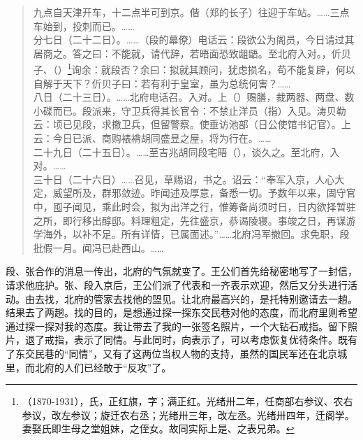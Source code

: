 \begin{quote}
	九点自天津开车，十二点半可到京。偕（郑的长子）往迎于车站。……三点车始到，投刺而已。……\\

分七日（二十二日）。……（段的幕僚）电话云：段欲公为阁员，今日请过其居商之。答之曰：不能就，请代辞，若晤面恐致龃龉。至北府入对。，伒贝子、（）\footnote{（1870-1931），氏，正红旗，字；满正红。光绪卅二年，任商部右参议、农右参议，改左参议；旋迁农右丞；光绪卅三年，改左丞。光绪卅四年，迁阁学。妻娶氏即生母之堂姐妹，之侄女。故同实际上是、之表兄弟。}询余：就段否？余曰：拟就其顾问，犹虑损名，苟不能复辟，何以自解于天下？伒贝子曰：若有利于皇室，虽为总统何害？……\\

八日（二十三日）。……北府电话召。入对。上（）赐膳，裁两器、两盘、数小碟而已。段派来，守卫兵得其长官令：不禁止洋员（指）入见。涛贝勒云：顷已见段，求撤卫兵，但留警察。使垂访池部（日公使馆书记官）。上云：今日已派、商购裱褙胡同盛昱之屋，将为行在。……\\

二十九日（二十五日）。……至吉兆胡同段宅晤（），谈久之。至北府，入对。……\\

三十日（二十六日）……召见，草赐诏，书之。诏云：“奉军入京，人心大定，威望所及，群邪敛迹。昨闻述及厚意，备悉一切。予数年以来，固守官中，囤子闻见，乘此时会，拟为出洋之行，惟筹备尚须时日，日内欲择暂驻之所，即行移出醇邸。料理粗定，先往盛京，恭谒陵寝。事竣之日，再谋游学海外，以补不足。所有详情，已属面述。”……北府冯军撤回。求免职，段批假一月。闻冯已赴西山。……\\
\end{quote}

段、张合作的消息一传出，北府的气氛就变了。王公们首先给秘密地写了一封信，请求他庇护。张、段入京后，王公们派了代表和一齐表示欢迎，然后又分头进行活动。由去找，北府的管家去找他的盟见。让北府最高兴的，是托特别邀请去一趟。结果去了两趟。找的目的，是想通过探一探东交民巷对他的态度，而北府里则希望通过探一探对我的态度。我让带去了我的一张签名照片，一个大钻石戒指。留下照片，退了戒指，表示了同情。与此同时，向表示了，可以考虑恢复优待条件。既有了东交民巷的“同情”，又有了这两位当权人物的支持，虽然的国民军还在北京城里，而北府的人们已经敢于“反攻”了。\\

